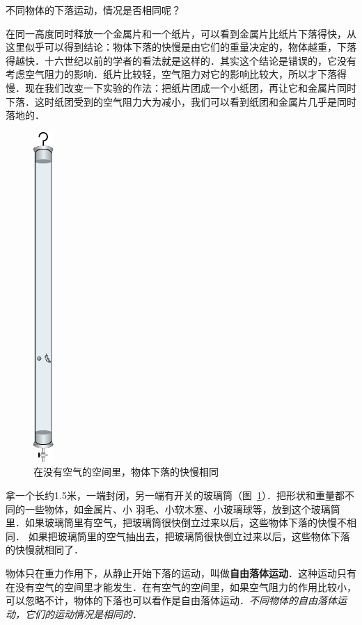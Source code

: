 不同物体的下落运动，情况是否相同呢？

在同一高度同时释放一个金属片和一个纸片，可以看到金属片比纸片下落得快，从这里似乎可以得到结论：物体下落的快慢是由它们的重量决定的，物体越重，下落得越快．十六世纪以前的学者的看法就是这样的．其实这个结论是错误的，它没有考虑空气阻力的影响．纸片比较轻，空气阻力对它的影响比较大，所以才下落得慢．现在我们改变一下实验的作法：把纸片团成一个小纸团，再让它和金属片同时下落．这时纸团受到的空气阻力大为减小，我们可以看到纸团和金属片几乎是同时落地的．
\begin{figure}[htp]
\centering
\includegraphics{fig/A/2-20.pdf}
\caption{在没有空气的空间里，物体下落的快慢相同}\label{fig_A_2-20}
\end{figure}

拿一个长约1.5米，一端封闭，另一端有开关的玻璃筒（图~\ref{fig_A_2-20}）．把形状和重量都不同的一些物体，如金属片、小
羽毛、小软木塞、小玻璃球等，放到这个玻璃筒里．如果玻璃筒里有空气，把玻璃筒很快倒立过来以后，这些物体下落的快慢不相同．
如果把玻璃筒里的空气抽出去，把玻璃筒很快倒立过来以后，这些物体下落的快慢就相同了．



物体只在重力作用下，从静止开始下落的运动，叫做\textbf{自由落体运动}．这种运动只有在没有空气的空间里才能发生．在有空气的空间里，如果空气阻力的作用比较小，可以忽略不计，物体的下落也可以看作是自由落体运动．\textit{不同物体的自由落体运动，它们的运动情况是相同的}．

